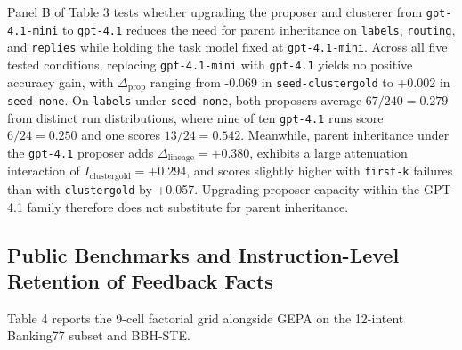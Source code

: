 \documentclass[10pt]{article}
\begin{document}
Panel B of Table 3 tests whether upgrading the proposer and clusterer
from \texttt{gpt-4.1-mini} to \texttt{gpt-4.1} reduces the need for
parent inheritance on \texttt{labels}, \texttt{routing}, and
\texttt{replies} while holding the task model fixed at
\texttt{gpt-4.1-mini}. Across all five tested conditions, replacing
\texttt{gpt-4.1-mini} with \texttt{gpt-4.1} yields no positive accuracy
gain, with \(\Delta_{\text{prop}}\) ranging from -0.069 in
\texttt{seed-clustergold} to +0.002 in \texttt{seed-none}. On
\texttt{labels} under \texttt{seed-none}, both proposers average
\(67/240 = 0.279\) from distinct run distributions, where nine of ten
\texttt{gpt-4.1} runs score \(6/24 = 0.250\) and one scores
\(13/24 = 0.542\). Meanwhile, parent inheritance under the
\texttt{gpt-4.1} proposer adds \(\Delta_{\text{lineage}} = +0.380\),
exhibits a large attenuation interaction of
\(I_{\text{clustergold}} = +0.294\), and scores slightly higher with
\texttt{first-k} failures than with \texttt{clustergold} by +0.057.
Upgrading proposer capacity within the GPT-4.1 family therefore does not
substitute for parent inheritance.

\hypertarget{public-benchmarks-and-instruction-level-retention-of-feedback-facts}{%
\subsection{Public Benchmarks and Instruction-Level Retention of
Feedback
Facts}\label{public-benchmarks-and-instruction-level-retention-of-feedback-facts}}

Table 4 reports the 9-cell factorial grid alongside GEPA on the
12-intent Banking77 subset and BBH-STE.
\end{document}
